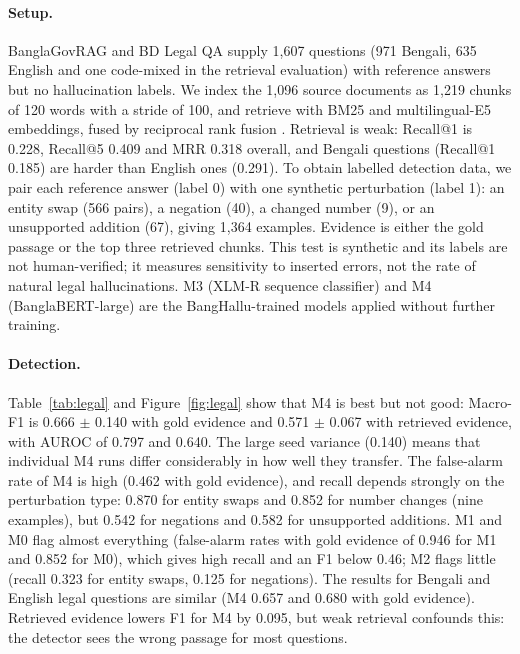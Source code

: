 \documentclass[manuscript,screen,review]{acmart}
\begin{document}
\paragraph{Setup.}
BanglaGovRAG and BD Legal QA supply 1,607 questions (971 Bengali, 635 English and one code-mixed in the retrieval evaluation) with reference answers but no hallucination labels. We index the 1,096 source documents as 1,219 chunks of 120 words with a stride of 100, and retrieve with BM25 \cite{robertson2009bm25} and multilingual-E5 \cite{wang2024e5} embeddings, fused by reciprocal rank fusion \cite{cormack2009rrf}. Retrieval is weak: Recall@1 is 0.228, Recall@5 0.409 and MRR 0.318 overall, and Bengali questions (Recall@1 0.185) are harder than English ones (0.291). To obtain labelled detection data, we pair each reference answer (label 0) with one synthetic perturbation (label 1): an entity swap (566 pairs), a negation (40), a changed number (9), or an unsupported addition (67), giving 1,364 examples. Evidence is either the gold passage or the top three retrieved chunks. This test is synthetic and its labels are not human-verified; it measures sensitivity to inserted errors, not the rate of natural legal hallucinations. M3 (XLM-R sequence classifier) and M4 (BanglaBERT-large) are the BangHallu-trained models applied without further training.

\paragraph{Detection.}
Table~\ref{tab:legal} and Figure~\ref{fig:legal} show that M4 is best but not good: Macro-F1 is 0.666 $\pm$ 0.140 with gold evidence and 0.571 $\pm$ 0.067 with retrieved evidence, with AUROC of 0.797 and 0.640. The large seed variance (0.140) means that individual M4 runs differ considerably in how well they transfer. The false-alarm rate of M4 is high (0.462 with gold evidence), and recall depends strongly on the perturbation type: 0.870 for entity swaps and 0.852 for number changes (nine examples), but 0.542 for negations and 0.582 for unsupported additions. M1 and M0 flag almost everything (false-alarm rates with gold evidence of 0.946 for M1 and 0.852 for M0), which gives high recall and an F1 below 0.46; M2 flags little (recall 0.323 for entity swaps, 0.125 for negations). The results for Bengali and English legal questions are similar (M4 0.657 and 0.680 with gold evidence). Retrieved evidence lowers F1 for M4 by 0.095, but weak retrieval confounds this: the detector sees the wrong passage for most questions.
\end{document}
